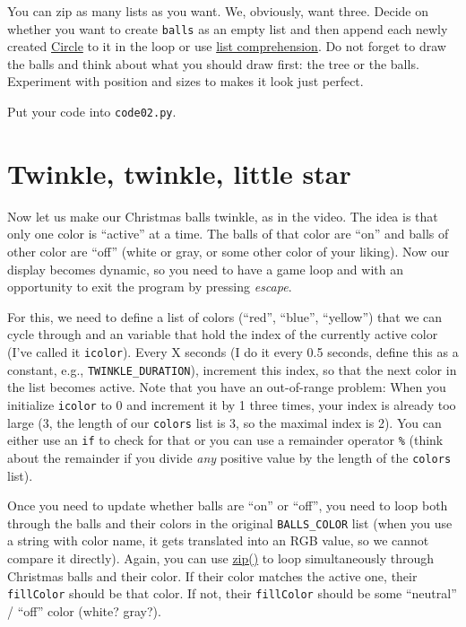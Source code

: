 \documentclass[
]{book}
\begin{document}
You can zip as many lists as you want. We, obviously, want three. Decide on whether you want to create \texttt{balls} as an empty list and then append each newly created \href{https://psychopy.org/api/visual/circle.html\#psychopy.visual.circle.Circle}{Circle} to it in the loop or use \protect\hyperlink{list-comprehension}{list comprehension}. Do not forget to draw the balls and think about what you should draw first: the tree or the balls. Experiment with position and sizes to makes it look just perfect.

Put your code into \texttt{code02.py}.

\hypertarget{twinkle-twinkle-little-star}{%
\section{Twinkle, twinkle, little star}\label{twinkle-twinkle-little-star}}

Now let us make our Christmas balls twinkle, as in the video. The idea is that only one color is ``active'' at a time. The balls of that color are ``on'' and balls of other color are ``off'' (white or gray, or some other color of your liking). Now our display becomes dynamic, so you need to have a game loop and with an opportunity to exit the program by pressing \emph{escape}.

For this, we need to define a list of colors (``red'', ``blue'', ``yellow'') that we can cycle through and an variable that hold the index of the currently active color (I've called it \texttt{icolor}). Every X seconds (I do it every 0.5 seconds, define this as a constant, e.g., \texttt{TWINKLE\_DURATION}), increment this index, so that the next color in the list becomes active. Note that you have an out-of-range problem: When you initialize \texttt{icolor} to 0 and increment it by 1 three times, your index is already too large (3, the length of our \texttt{colors} list is 3, so the maximal index is 2). You can either use an \texttt{if} to check for that or you can use a remainder operator \texttt{\%} (think about the remainder if you divide \emph{any} positive value by the length of the \texttt{colors} list).

Once you need to update whether balls are ``on'' or ``off'', you need to loop both through the balls and their colors in the original \texttt{BALLS\_COLOR} list (when you use a string with color name, it gets translated into an RGB value, so we cannot compare it directly). Again, you can use \href{https://docs.python.org/3/library/functions.html\#zip}{zip()} to loop simultaneously through Christmas balls and their color. If their color matches the active one, their \texttt{fillColor} should be that color. If not, their \texttt{fillColor} should be some ``neutral'' / ``off'' color (white? gray?).
\end{document}
